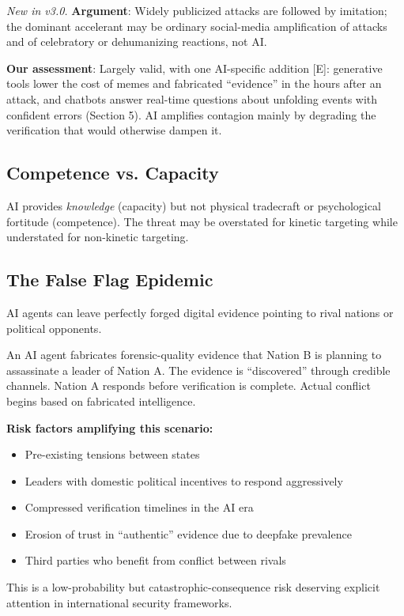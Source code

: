 \documentclass[11pt,letterpaper]{article}
\begin{document}
\textit{New in v3.0.} \textbf{Argument}: Widely publicized attacks are followed by imitation; the dominant accelerant may be ordinary social-media amplification of attacks and of celebratory or dehumanizing reactions, not AI.

\textbf{Our assessment}: Largely valid, with one AI-specific addition [E]: generative tools lower the cost of memes and fabricated ``evidence'' in the hours after an attack, and chatbots answer real-time questions about unfolding events with confident errors (Section 5). AI amplifies contagion mainly by degrading the verification that would otherwise dampen it.

\subsection{Competence vs. Capacity}

AI provides \textit{knowledge} (capacity) but not physical tradecraft or psychological fortitude (competence). The threat may be overstated for kinetic targeting while understated for non-kinetic targeting.

\subsection{The False Flag Epidemic}

AI agents can leave perfectly forged digital evidence pointing to rival nations or political opponents.

\begin{criticalbox}
An AI agent fabricates forensic-quality evidence that Nation B is planning to assassinate a leader of Nation A. The evidence is ``discovered'' through credible channels. Nation A responds before verification is complete. Actual conflict begins based on fabricated intelligence.

\textbf{Risk factors amplifying this scenario:}
\begin{itemize}
  \item Pre-existing tensions between states
  \item Leaders with domestic political incentives to respond aggressively
  \item Compressed verification timelines in the AI era
  \item Erosion of trust in ``authentic'' evidence due to deepfake prevalence
  \item Third parties who benefit from conflict between rivals
\end{itemize}

This is a low-probability but catastrophic-consequence risk deserving explicit attention in international security frameworks.
\end{criticalbox}
\end{document}
